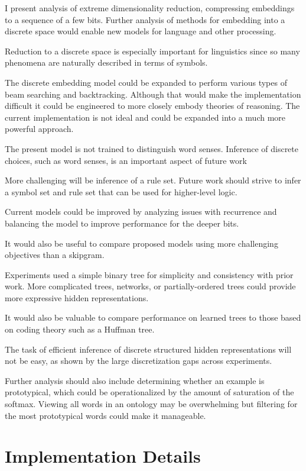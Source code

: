 \documentclass[sigconf]{acmart}
\begin{document}
I present analysis of extreme dimensionality reduction, compressing embeddings to a sequence of a few bits. Further analysis of methods for embedding into a discrete space would enable new models for language and other processing.

Reduction to a discrete space is especially important for linguistics since so many phenomena are naturally described in terms of symbols.

The discrete embedding model could be expanded to perform various types of beam searching and backtracking. Although that would make the implementation difficult it could be engineered to more closely embody theories of reasoning. The current implementation is not ideal and could be expanded into a much more powerful approach.

The present model is not trained to distinguish word senses. Inference of discrete choices, such as word senses, is an important aspect of future work

More challenging will be inference of a rule set. Future work should strive to infer a symbol set and rule set that can be used for higher-level logic.

Current models could be improved by analyzing issues with recurrence and balancing the model to improve performance for the deeper bits.

It would also be useful to compare proposed models using more challenging objectives than a skipgram.

Experiments used a simple binary tree for simplicity and consistency with prior work. More complicated trees, networks, or partially-ordered trees could provide more expressive hidden representations.

It would also be valuable to compare performance on learned trees to those based on coding theory such as a Huffman tree.

The task of efficient inference of discrete structured hidden representations will not be easy, as shown by the large discretization gaps across experiments.

Further analysis should also include determining whether an example is prototypical, which could be operationalized by the amount of saturation of the softmax. Viewing all words in an ontology may be overwhelming but filtering for the most prototypical words could make it manageable.

\section{Implementation Details}
\end{document}
